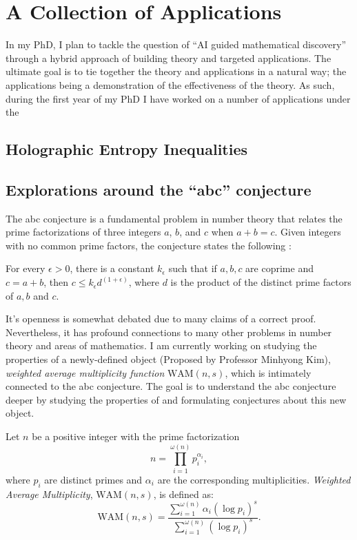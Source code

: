 \chapter{A Collection of Applications}
In my PhD, I plan to tackle the question of ``AI guided mathematical discovery'' through a hybrid approach of building theory and targeted applications. The ultimate goal is to tie together the theory and applications in a natural way; the applications being a demonstration of the effectiveness of the theory. As such, during the first year of my PhD I have worked on a number
of applications under the 
\section{Holographic Entropy Inequalities}

\section{Explorations around the ``abc'' conjecture}
\label{sec:abc-conjecture}
The abc conjecture is a fundamental problem in number theory that relates the prime factorizations of three integers $a$, $b$, and $c$ when $a + b = c$. Given integers with no common prime factors, the conjecture states the following \cite{masser1985open}:
\begin{conjecture}
    \label{abc}
    For every $\epsilon > 0$, there is a constant $k_\epsilon$ such that if $a,b,c$ are coprime and $c = a + b$, then $c\leq k_\epsilon d^{(1 + \epsilon)}$, where $d$ is the product of the distinct prime factors of $a, b$ and $c$.
\end{conjecture}
It's openness is somewhat debated due to many claims of a correct proof. Nevertheless, it has profound connections to many other problems in number theory and areas of mathematics. I am currently working on studying the properties of a newly-defined object (Proposed by Professor Minhyong Kim), \emph{weighted average multiplicity function} $\text{WAM}(n, s)$,
which is intimately connected to the abc conjecture. The goal is to understand the abc conjecture deeper by studying the properties of and formulating conjectures about this new object.

\begin{definition}
    Let $n$ be a positive integer with the prime factorization 
    \[
    n = \prod_{i=1}^{\omega(n)} p_i^{\alpha_i},
    \]
    where $p_i$ are distinct primes and $\alpha_i$ are the corresponding multiplicities.
    \emph{Weighted Average Multiplicity}, $\text{WAM}(n, s)$, is defined as:
    \[
    \text{WAM}(n, s) = \frac{\sum_{i=1}^{\omega(n)} \alpha_i (\log p_i)^s}{\sum_{i=1}^{\omega(n)} (\log p_i)^s}.
    \]
\end{definition}

